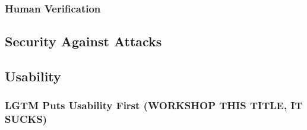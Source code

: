 \documentclass[12pt]{report}
\begin{document}
\subsubsection{Human Verification}


\subsection{Security Against Attacks} %


\subsection{Usability}

\subsubsection{LGTM Puts Usability First (WORKSHOP THIS TITLE, IT SUCKS)}

\end{document}
